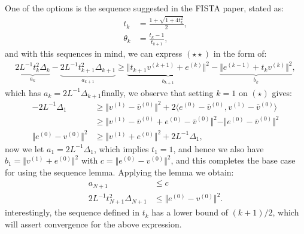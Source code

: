 \documentclass[]{article}
\theoremstyle{definition}
\begin{document}
        One of the options is the sequence suggested in the FISTA paper, stated as: 
        \begin{align*}
            t_k &= \frac{1 + \sqrt{1 + 4t_k^2}}{2}, 
            \\
            \theta_k &= \frac{t_k - 1}{t_{k + 1}}, 
            \tag{$\star \star *$}
        \end{align*}
        and with this sequences in mind, we can express $(\star\star)$ in the form of:
        \begin{align*}
            \underbrace{2L^{-1}t_k^2\Delta_k}_{a_k} - \underbrace{2L^{-1}t_{k + 1}^2\Delta_{k + 1}}_{a_{k + 1}}
            \ge 
            \underbrace{\Vert t_{k + 1}v^{(k + 1)} + e^{(k)}\Vert^2}_{b_{k + 1}}
            - 
            \underbrace{\Vert e^{(k - 1)} + t_k  v^{(k)} \Vert^2}_{b_{k}}, 
        \end{align*}
        which has $a_k = 2L^{-1}\Delta_{k + 1}$finally, we observe that setting $k = 1$ on $(\star)$ gives: 
        \begin{align*}
            -2L^{-1}  \Delta_1
            & \ge 
            \Vert v^{(1)} - \bar v^{(0)}\Vert^2 + 
            2\langle e^{(0)} - \bar v^{(0)}, v^{(1)} - \bar v^{(0)}\rangle
            \\
            &\ge
            \Vert 
                v^{(1)} - \bar v^{(0)}
                + 
                e^{(0)} - \bar v^{(0)}
            \Vert^2
            - 
            \Vert 
                e^{(0)} - \bar v^{(0)}
            \Vert^2
            \\
            \Vert e^{(0)} - v^{(0)}\Vert^2
            & \ge 
            \Vert v^{(1)} + e^{(0)}\Vert^2 + 2L^{-1}\Delta_1, 
        \end{align*}
        now we let $a_1 = 2L^{-1}\Delta_1$, which implies $t_1 = 1$, and hence we also have $b_1 = \Vert v^{(1)} + e^{(0)}\Vert^2$ with $c = \Vert e^{(0)} - v^{(0)}\Vert^2$, and this completes the base case for using the sequence lemma. Applying the lemma we obtain: 
        \begin{align*}
            a_{N + 1} &\le c
            \\
            2L^{-1}t_{N + 1}^2\Delta_{N + 1} &\le \Vert e^{(0)} - v^{(0)}\Vert^2.
        \end{align*}
        interestingly, the sequence defined in $t_k$ has a lower bound of $(k + 1)/2$, which will assert convergence for the above expression. 



\end{document}
